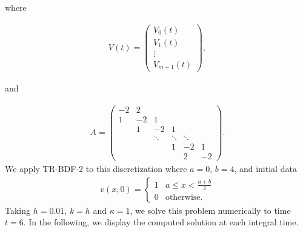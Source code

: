 \documentclass{article}
\begin{document}
where

\begin{align*}
	V(t) = \begin{pmatrix} V_0(t)\\ V_1(t) \\ \vdots \\ V_{m+1}(t) \end{pmatrix},
\end{align*}

and

\begin{align*}
	A = \begin{pmatrix}
		-2  & 2\\
		1 & -2 & 1 \\
		& 1 & -2 & 1\\
		&& \ddots & \ddots & \ddots \\
		&&& 1 & -2 & 1\\
		&&&& 2 & -2 \end{pmatrix}.
\end{align*}
We apply TR-BDF-2 to this discretization where $a=0$, $b=4$, and initial data 
\begin{align*}
	v(x,0) = \begin{cases} 1 &a \leq x < \frac{a+b}{2} \\
		0 & \text{otherwise}.
	\end{cases}
\end{align*}
Taking \(h = 0.01\), \(k = h\) and \(\kappa = 1\), we solve this problem numerically to time $t=6$. In the following, we display the computed solution at each integral time. 
\end{document}
